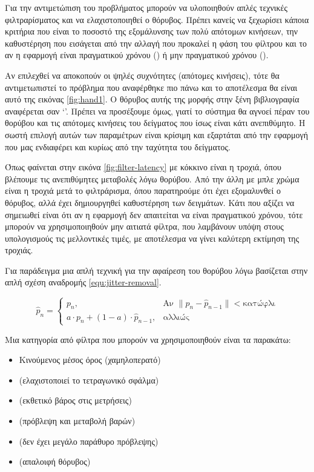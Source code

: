 Για την αντιμετώπιση του προβλήματος μπορούν να υλοποιηθούν απλές τεχνικές φιλτραρίσματος και να ελαχιστοποιηθεί ο θόρυβος. Πρέπει κανείς να ξεχωρίσει κάποια κριτήρια που είναι το ποσοστό της εξομάλυνσης των πολύ απότομων κινήσεων, την καθυστέρηση που εισάγεται από την αλλαγή που προκαλεί η φάση του φίλτρου και το αν η εφαρμογή είναι πραγματικού χρόνου () ή μην πραγματικού χρόνου ().

Αν επιλεχθεί να αποκοπούν οι ψηλές συχνότητες (απότομες κινήσεις), τότε θα αντιμετωπιστεί το πρόβλημα που αναφέρθηκε πιο πάνω και το αποτέλεσμα θα είναι αυτό της εικόνας \ref{fig:hand1}. Ο θόρυβος αυτής της μορφής στην ξένη βιβλιογραφία αναφέρεται σαν \lq {}\rq . Πρέπει να προσέξουμε όμως, γιατί το σύστημα θα αγνοεί πέραν του θορύβου και τις απότομες κινήσεις του δείγματος που ίσως είναι κάτι ανεπιθύμητο. Η σωστή επιλογή αυτών των παραμέτρων είναι κρίσιμη και εξαρτάται από την εφαρμογή που μας ενδιαφέρει και κυρίως από την ταχύτητα του δείγματος.

Όπως φαίνεται στην εικόνα \ref{fig:filter-latency} με κόκκινο είναι η τροχιά, όπου βλέπουμε τις ανεπιθύμητες μεταβολές λόγω θορύβου. Από την άλλη με μπλε χρώμα είναι η τροχιά μετά το φιλτράρισμα, όπου παρατηρούμε ότι έχει εξομαλυνθεί ο θόρυβος, αλλά έχει δημιουργηθεί καθυστέρηση των δειγμάτων. Κάτι που αξίζει να σημειωθεί είναι ότι αν η εφαρμογή δεν απαιτείται να είναι πραγματικού χρόνου, τότε μπορούν να χρησιμοποιηθούν μην αιτιατά φίλτρα, που λαμβάνουν υπόψη στους υπολογισμούς τις μελλοντικές τιμές, με αποτέλεσμα να γίνει καλύτερη εκτίμηση της τροχιάς.

Για παράδειγμα μια απλή τεχνική για την αφαίρεση του θορύβου λόγω  βασίζεται στην απλή σχέση αναδρομής \ref{equ:jitter-removal}.

\begin{equation}
    \hat{p}_{n} =
    \begin{cases}
        p_{n}, & \text{Αν } \|p_{n} - \hat{p}_{n-1}\| < \text{κατώφλι} \\
        a \cdot p_{n} + (1-a) \cdot \hat{p}_{n-1}, & \text{αλλιώς}
    \end{cases}
    \label{equ:jitter-removal}
\end{equation}

Μια κατηγορία από φίλτρα που μπορούν να χρησιμοποιηθούν είναι τα παρακάτω:

\begin{itemize}
    \item Κινούμενος μέσος όρος (χαμηλοπερατό)
    \item {} (ελαχιστοποιεί το τετραγωνικό σφάλμα)
    \item {} (εκθετικό βάρος στις μετρήσεις)
    \item {} (πρόβλεψη και μεταβολή βαρών)
    \item {} (δεν έχει μεγάλο παράθυρο πρόβλεψης)
    \item {} (απαλοιφή θόρυβος)
\end{itemize}

